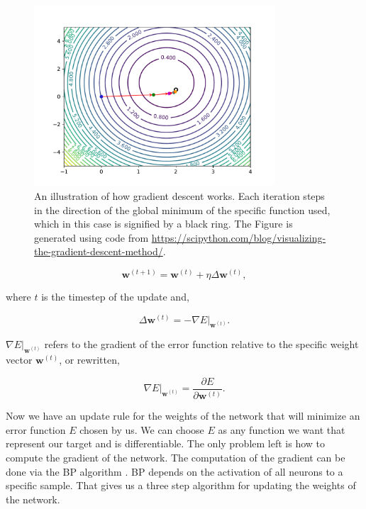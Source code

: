 \begin{figure}
    \centering
    \includegraphics[width=0.8\textwidth]{./pictures/method/gradient_descend}
    \caption{An illustration of how gradient descent works. Each iteration steps
        in the direction of the global minimum of the specific function used,
        which in this case is signified by a black ring. The Figure is generated
        using code from
        \url{https://scipython.com/blog/visualizing-the-gradient-descent-method/}.}
    \label{fig:gradient_descent}
\end{figure}

\begin{equation} \label{eq:gradient_descent_network_update}
    \mathbf{w}^{(t+1)} = \mathbf{w}^{(t)} + \eta \Delta \mathbf{w}^{(t)},
\end{equation}

where $t$ is the timestep of the update and,

\begin{equation}
    \Delta \mathbf{w}^{(t)} = -\nabla E|_{\mathbf{w}^{(t)}}.
\end{equation}

$\nabla E|_{\mathbf{w}^{(t)}}$ refers to the gradient of the error function
relative to the specific weight vector $\mathbf{w}^{(t)}$, or rewritten,

\begin{equation}
    \nabla E|_{\mathbf{w}^{(t)}} = \frac{\partial E}{\partial \mathbf{w}^{(t)}}.
\end{equation}

Now we have an update rule for the weights of the network that will minimize
an error function $E$ chosen by us. We can choose $E$ as any function we want
that represent our target and is differentiable. The only problem left is how
to compute the gradient of the network. The computation of the gradient can be
done via the \gls{BP} algorithm \cite{Bishop}. \Gls{BP} depends on the
activation of all neurons to a specific sample. That gives us a three step
algorithm for updating the weights of the network.

